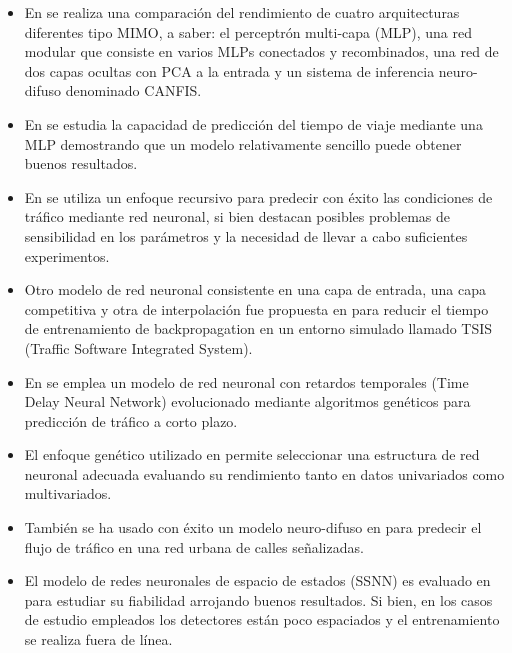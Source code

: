\documentclass{llncs}
\begin{document}
\begin{itemize}

\item En \cite{Ishak2004452} se realiza una comparación del rendimiento de cuatro arquitecturas diferentes tipo MIMO, a saber: el perceptrón multi-capa (MLP), una red modular que consiste en varios MLPs conectados y recombinados, una red de dos capas ocultas con PCA a la entrada y un sistema de inferencia neuro-difuso denominado CANFIS.

\item En \cite{Innamaa2005649} se estudia la capacidad de predicción del tiempo de viaje mediante una MLP demostrando que un modelo relativamente sencillo puede obtener buenos resultados.

\item En \cite{Zhang2000472} se utiliza un enfoque recursivo para predecir con éxito las condiciones de tráfico mediante red neuronal, si bien destacan posibles problemas de sensibilidad en los parámetros y la necesidad de llevar a cabo suficientes experimentos.

\item Otro modelo de red neuronal consistente en una capa de entrada, una capa competitiva y otra de interpolación fue  propuesta en \cite{Dharia2003607} para reducir el tiempo de entrenamiento de backpropagation en un entorno simulado llamado TSIS (Traffic Software Integrated System). 

\item En \cite{abdulhai2002short} se emplea un modelo de red neuronal con retardos temporales (Time Delay Neural Network) evolucionado mediante algoritmos genéticos para predicción de tráfico a corto plazo.

\item El enfoque genético utilizado en \cite{vlahogianni2005optimized} permite seleccionar una estructura de red neuronal adecuada evaluando su rendimiento tanto en datos univariados como multivariados.

\item También se ha usado con éxito un modelo neuro-difuso en \cite{yin2002urban} para predecir el flujo de tráfico en una red urbana de calles señalizadas.

\item El modelo de redes neuronales de espacio de estados (SSNN) es evaluado en \cite{van2006reliable} para estudiar su fiabilidad arrojando buenos resultados. Si bien, en los casos de estudio empleados los detectores están poco espaciados y el entrenamiento se realiza fuera de línea.

\end{itemize}
\end{document}
